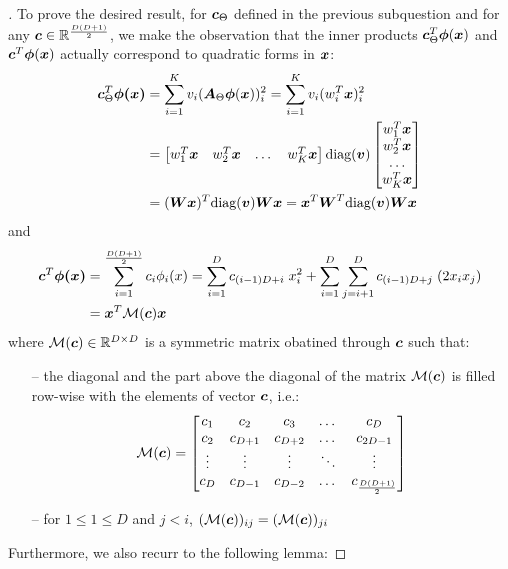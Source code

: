 \documentclass{exam}
\begin{document}
\begin{questions}
        \question
        \begin{proof}[\unskip\nopunct]
        To prove the desired result, for $\vb*{c}_{\Theta}$ defined in the previous subquestion and for any $\vb*{c} \in \mathbb{R}^{\frac{D(D + 1)}{2}}$, we make the observation that the inner products $\vb*{c}_{\Theta}^T  \vb*{\phi}(\vb*{x})$ and $\vb*{c}^T  \vb*{\phi}(\vb*{x})$ actually correspond to quadratic forms in $\vb*{x}$:
        \begin{align*}
            \vb*{c}_{\Theta}^T \vb*{\phi(x)} &= \sum_{i = 1}^K v_i (\vb*{A}_{\Theta} \vb*{\phi}(\vb*{x}))^2_i = 
            \sum_{i = 1}^K v_i (w_i^T \vb*{x})^2_i \\
            &= 
            \begin{bmatrix}
                w_1^T \vb*{x} & w_2^T \vb*{x} & \dots & w_K^T \vb*{x}
            \end{bmatrix}
            \text{diag}(\vb*{v})
            \begin{bmatrix}
                w_1^T \vb*{x} \\ w_2^T \vb*{x} \\ \dots \\ w_K^T \vb*{x}
            \end{bmatrix} \\
            &= (\vb*{Wx})^T \text{diag}(\vb*{v}) \vb*{Wx} 
             = \vb*{x}^T \vb*{W}^T \text{diag}(\vb*{v}) \vb*{Wx} 
        \end{align*}
        and 
        \begin{align*}
            \vb*{c}^T \vb*{\phi(x)} &= \sum_{i = 1}^{\frac{D(D + 1)}{2}} c_i \phi_i(x) = \sum_{i = 1}^{D} c_{(i - 1)D + i}\; x_i^2 + \sum_{i = 1}^{D}\sum_{j = i + 1}^{D} c_{(i - 1)D + j}\;(2 x_i x_j) \\
            &= \vb*{x}^T \mathcal{M}(\vb*{c}) \vb*{x}
        \end{align*}
        where $\mathcal{M}(\vb*{c}) \in \mathbb{R}^{D \times D}$ is a symmetric matrix obatined through $\vb*{c}$ such that:
        \begin{itemize}
            \item[--] the diagonal and the part above the diagonal of the matrix $\mathcal{M}(\vb*{c})$ is filled row-wise with the elements of vector $\vb*{c}$, i.e.:
            \[
                \mathcal{M}(\vb*{c}) = 
                \begin{bmatrix}
                    c_1 & c_2 & c_3 & \dots & c_D \\
                    c_2 & c_{D + 1} & c_{D + 2} & \dots & c_{2D - 1} \\
                    \vdots & \vdots & \vdots & \ddots & \vdots \\
                    c_D & c_{D - 1} & c_{D - 2} & \dots & c_{\frac{D(D + 1)}{2}} 
                \end{bmatrix}
            \]
            \item[--] for $1 \le 1 \le D$ and $j < i$, $(\mathcal{M}(\vb*{c}))_{ij} = (\mathcal{M}(\vb*{c}))_{ji}$
        \end{itemize}
        Furthermore, we also recurr to the following lemma:


\end{proof}
\end{questions}
\end{document}
